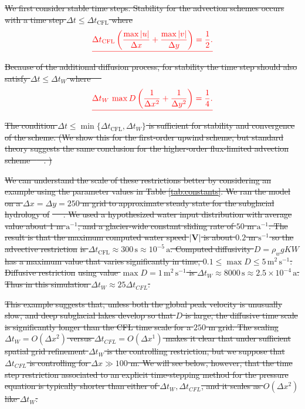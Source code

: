 \documentclass[gmd]{copernicus}   %
\newcommand{\text}{\textrm}
\newcommand\bV{\mathbf{V}}
\newcommand{\Nbreen}{Nordenski\"oldbreen\xspace}
\providecommand{\DIFdel}[1]{{\protect\color{red}\sout{#1}}}                      %
\begin{document}
\DIFdel{We first consider stable time steps.  Stability for the advection schemes occurs with a time step $\Delta t \le \Delta t_{\text{CFL}}$ where
}\begin{displaymath}\DIFdel{
\Delta t_{\text{CFL}} \left(\frac{\max |u|}{\Delta x} + \frac{\max |v|}{\Delta y}\right) = \frac{1}{2}. \label{eq:dtCFL}
}\end{displaymath}
\DIFdel{Because of the additional diffusion process, for stability the time step should also satisfy $\Delta t \le \Delta t_{W}$  where \mbox{%
\citep{MortonMayers}
}%
}\begin{displaymath}\DIFdel{
\Delta t_W\, \max D \left(\frac{1}{\Delta x^2} + \frac{1}{\Delta y^2}\right) = \frac{1}{4}. \label{eq:dtDIFFW}
}\end{displaymath}
\DIFdel{The condition $\Delta t \le \min\{\Delta t_{\text{CFL}}, \Delta t_W\}$ is sufficient for stability and convergence of the scheme.  (We show this for the first-order upwind scheme, but standard theory suggests the same conclusion for the higher-order flux-limited advection scheme \mbox{%
\citep{HundsdorferVerwer2010}
}%
.  )
}%

\DIFdel{We can understand the scale of these restrictions better by considering an example using the parameter values in Table \ref{tab:constants}.  We ran the model on a $\Delta x = \Delta y = 250$ m grid to approximate steady state for the subglacial hydrology of }%
\DIFdel{\mbox{%
\citep{vanPeltthesis}
}%
.  We used a hypothesized water input distribution with average value about 1 m $\text{a}^{-1}$, and a glacier-wide constant sliding rate of $50$ m $\text{a}^{-1}$.  The result is that the maximum computed water speed $|\bV|$ is about $0.2$ m $\text{s}^{-1}$ so the advective restriction }%
\DIFdel{is $\Delta t_{\text{CFL}} \approx 300\,\text{s} \approx 10^{-5}\,\text{a}$.  Computed diffusivity $D = \rho_w g K W$ has a maximum value that varies significantly in time, $0.1 \le \max D \le 5 \,\text{m}^2\,\text{s}^{-1}$.  Diffusive restriction }%
\DIFdel{using value $\max D=1\,\text{m}^2\,\text{s}^{-1}$ is $\Delta t_W \approx 8000\,\text{s} \approx 2.5 \times 10^{-4}\,\text{a}$.  Thus in this simulation $\Delta t_W \approx 25 \Delta t_{CFL}$.
}%

\DIFdel{This example suggests that, unless both the global peak velocity is unusually slow, and deep subglacial lakes develop so that $D$ is large, the diffusive time scale is significantly longer than the CFL time scale for a $250$ m grid.  The scaling $\Delta t_W = O(\Delta x^2)$ versus $\Delta t_{CFL} = O(\Delta x^1)$ makes it clear that under sufficient spatial grid refinement $\Delta t_W$ is the controlling restriction, but we suppose that $\Delta t_{CFL}$ is controlling for $\Delta x \gg 100$ m.  We will see below, however, that the time step restriction associated to an explicit time-stepping method for the pressure equation is typically shorter than either of $\Delta t_W,\Delta t_{CFL}$, and it scales as $O(\Delta x^2)$ like $\Delta t_W$.
}%
\end{document}
